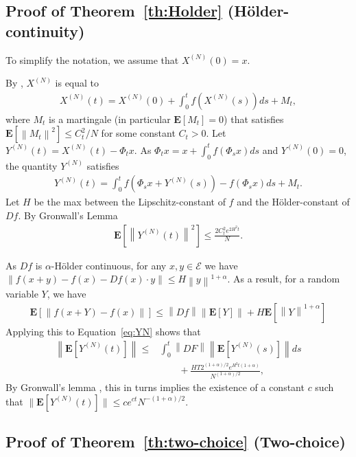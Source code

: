 \documentclass[sigconf]{acmart}
\newcommand\XN{X^{(N)}}
\newcommand\YN{Y^{(N)}}
\newcommand\E{\mathcal{E}}
\newcommand\esp[1]{\mathbf{E}\left[#1\right]}
\newcommand\sesp[1]{\mathbf{E}[#1]}
\newcommand\norm[1]{\left\|#1\right\|}
\newcommand\snorm[1]{\|#1\|}
\begin{document}
\subsection{Proof of Theorem~\ref{th:Holder} (Hölder-continuity)}
\label{sec:Holder_proof}

To simplify the notation, we assume that $\XN(0)=x$.

By \cite{kurtz1978strong}, $\XN$ is equal to
\begin{align*}
  \XN(t) = \XN(0) + \int_0^t f(\XN(s))ds + M_t,
\end{align*}
where $M_t$ is a martingale (in particular $\esp{M_t}=0$) that
satisfies $\esp{\norm{M_t}^2}\le C^2_t/N$ for some constant $C_t>0$.
Let $\YN(t)=\XN(t)-\Phi_tx$. As $\Phi_tx=x + \int_0^tf(\Phi_sx)ds$ and
$\YN(0)=0$, the quantity $\YN$ satisfies
\begin{align}
  \YN(t) =  \int_0^tf(\Phi_sx+\YN(s))-f(\Phi_sx)ds + M_t.
  \label{eq:YN}
\end{align}
Let $H$ be the max between the Lipschitz-constant of $f$ and the
Hölder-constant of $Df$.  By Gronwall's Lemma \cite[Lemma~1.5.1, Part
II]{cartan1977cours}
\begin{align*}
  \esp{\norm{\YN(t)}^2}\le \frac{2C^2_te^{2H^2t}}{N}.
\end{align*}

As $Df$ is $\alpha$-Hölder continuous, for any $x,y\in\E$ we have\\
$\norm{f(x+y)-f(x)- Df(x)\cdot y}\le H\norm{y}^{1+\alpha}$.  As a
result, for a random variable $Y$, we have
\begin{align*}
  \esp{\norm{f(x+Y)-f(x)}}\le \norm{Df}\norm{\esp{Y}} +
  H\esp{\norm{Y}^{1+\alpha}}
\end{align*}
Applying this to Equation~\eqref{eq:YN} shows that
\begin{align*}
  \norm{\esp{\YN(t)}} \le &
  \int_0^t\norm{DF}\norm{\esp{\YN(s)}}ds\\
                   &\qquad+\frac{HT2^{(1+\alpha)/2}e^{H^2t(1+\alpha)}}{N^{(1+\alpha)/2}},
\end{align*}
By Gronwall's lemma \cite[Lemma~1.5.1, Part II]{cartan1977cours}, this
in turns implies the existence of a constant $c$ such that
$\snorm{\sesp{\YN(t)}}\le c e^{ct} N^{-(1+\alpha)/2}$.



\subsection{Proof of Theorem~\ref{th:two-choice} (Two-choice)}
\label{sec:proof_2c}
\end{document}
